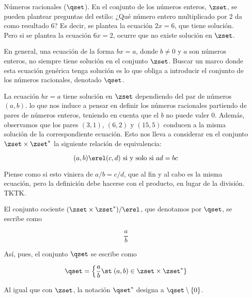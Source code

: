 \begin{example}
  Números racionales ($\qset$). En el conjunto de los números enteros,
  $\zset$, se pueden plantear preguntas del estilo: ¿Qué número entero
  multiplicado por 2 da como resultado 6? Es decir, se plantea la ecuación
  $2x = 6$, que tiene solución. Pero si se plantea la ecuación $6x = 2$,
  ocurre que no existe solución en $\zset$.

  En general, una ecuación de la forma $bx = a$, donde $b \neq 0$ y $a$ son
  números enteros, no siempre tiene solución en el conjunto $\zset$. Buscar
  un marco donde esta ecuación genérica tenga solución es lo que obliga a
  introducir el conjunto de los números racionales, denotado $\qset$.

  La ecuación $bx = a$ tiene solución en $\zset$ dependiendo del par de
  números $(a, b)$. lo que nos induce a pensar en definir los números
  racionales partiendo de pares de números enteros, teniendo en cuenta que
  el $b$ no puede valer 0. Además, observamos que los pares $(3, 1)$, $(6,
  2)$ y $(15, 5)$ conducen a la misma solución de la correspondiente
  ecuación. Esto nos lleva a considerar en el conjunto $\zset \times
  \zset^*$ la siguiente relación de equivalencia:

  \[ (a, b) \erel (c, d) \ \text{si y solo si} \ ad = bc \]

  \noindent Piense como si esto viniera de $a/b = c/d$, que al fin y al cabo
  es la misma ecuación, pero la definición debe hacerse con el producto, en
  lugar de la división. TKTK.

  El conjunto cociente $(\zset \times \zset^*)/\erel$, que denotamos por
  $\qset$, se escribe como

  \[ \frac{a}{b} \]

  \noindent Así, pues, el conjunto $\qset$ se escribe como

  \[ \qset = \left\{ \frac{a}{b} \st \right. (a, b) \in \zset \times
  \zset^*\} \]

  Al igual que con $\zset$, la notación $\qset^*$ designa a $\qset \setminus
  \{0\}$.
\end{example}

